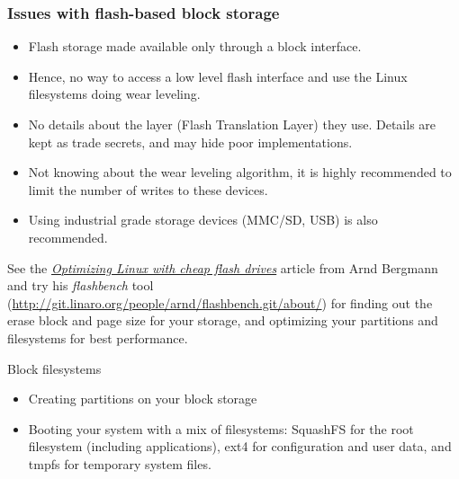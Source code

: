 \begin{frame}
  \frametitle{Issues with flash-based block storage}
  \begin{itemize}
  \item Flash storage made available only through a block interface.
  \item Hence, no way to access a low level flash interface
    and use the Linux filesystems doing wear leveling.
  \item No details about the layer (Flash Translation Layer) they
    use. Details are kept as trade secrets, and may hide poor
    implementations.
  \item Not knowing about the wear leveling algorithm, it is highly
    recommended to limit the number of writes to these devices.
  \item Using industrial grade storage devices (MMC/SD, USB) is
    also recommended.
  \end{itemize}
  See the \href{https://lwn.net/Articles/428584/}{\em Optimizing Linux with
  cheap flash drives} article from Arnd Bergmann and try his {\em
  flashbench} tool (\url{http://git.linaro.org/people/arnd/flashbench.git/about/})
  for finding out the erase block and page size for your storage, and
  optimizing your partitions and filesystems for best performance.
\end{frame}

\setuplabframe
{Block filesystems}
{
  \begin{itemize}
  \item Creating partitions on your block storage
  \item Booting your system with a mix of filesystems: SquashFS for
    the root filesystem (including applications), ext4 for
    configuration and user data, and tmpfs for
    temporary system files.
  \end{itemize}
}
